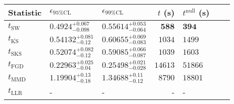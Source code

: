 \begin{tabular}{l|llr|llr}
	Statistic & $\epsilon_{95\%\mathrm{CL}}$ & $\epsilon_{99\%\mathrm{CL}}$ & $t$ (s) & $t^{\mathrm{null}}$ (s) \\
	\midrule
	$t_{\mathrm{SW}}$ & $0.4924_{-0.098}^{+0.067}$ & $0.55614_{-0.064}^{+0.053}$ & ${\mathbf{588}}$ & ${\mathbf{394}}$ \\
	$t_{\overline{\mathrm{KS}}}$ & $0.54132_{-0.12}^{+0.081}$ & $0.60655_{-0.083}^{+0.069}$ & $1034$ & $1499$ \\
	$t_{\mathrm{SKS}}$ & $0.52074_{-0.12}^{+0.082}$ & $0.59085_{-0.087}^{+0.066}$ & $1039$ & $1603$ \\
	$t_{\mathrm{FGD}}$ & ${\mathbf{0.22963_{-0.04}^{+0.025}}}$ & ${\mathbf{0.25498_{-0.028}^{+0.021}}}$ & $14613$ & $51866$ \\
	$t_{\mathrm{MMD}}$ & $1.19904_{-0.18}^{+0.13}$ & $1.34688_{-0.12}^{+0.11}$ & $8790$ & $18801$ \\
	$t_{\mathrm{LLR}}$ & - & - & - & - \\
	\bottomrule
\end{tabular}